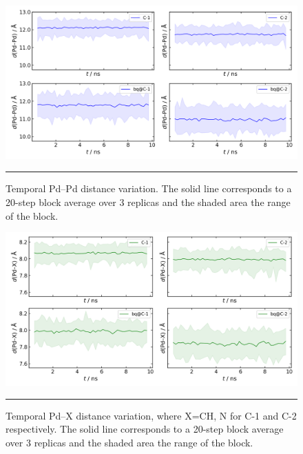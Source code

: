 \documentclass[../../main.tex]{subfiles}
\begin{document}
\begin{figure}[h!]
	\vspace{0.4cm}
	\centering
	\includegraphics[width=\textwidth]{3/da//figs/figS3}
	\vspace{0.2cm}
	\hrule
	\caption{Temporal Pd–Pd distance variation. The solid line corresponds to a 20-step block average over 3 replicas and the shaded area the range of the block.}
	\label{fig::si_da_3}
\end{figure}

\begin{figure}[h!]
	\vspace{0.4cm}
	\centering
	\includegraphics[width=\textwidth]{3/da//figs/figS4}
	\vspace{0.2cm}
	\hrule
	\caption{Temporal Pd–X distance variation, where X=CH, N for C-1 and C-2 respectively. The solid line corresponds to a 20-step block average over 3 replicas and the shaded area the range of the block.}
	\label{fig::si_da_4}
\end{figure}
\end{document}
